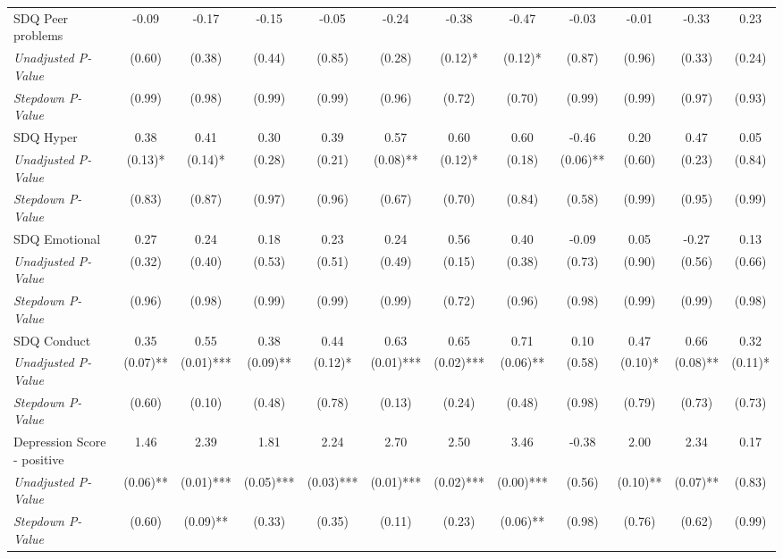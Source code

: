 \begin{tabular}{l c c c c c c c c c c c}
SDQ Peer problems & -0.09 & -0.17 & -0.15 & -0.05 & -0.24 & -0.38 & -0.47 & -0.03 & -0.01 & -0.33 & 0.23 \\
\quad \textit{Unadjusted P-Value} & (0.60) & (0.38) & (0.44) & (0.85) & (0.28) & (0.12)* & (0.12)* & (0.87) & (0.96) & (0.33) & (0.24) \\
\quad \textit{Stepdown P-Value} & (0.99) & (0.98) & (0.99) & (0.99) & (0.96) & (0.72) & (0.70) & (0.99) & (0.99) & (0.97) & (0.93) \\
SDQ Hyper & 0.38 & 0.41 & 0.30 & 0.39 & 0.57 & 0.60 & 0.60 & -0.46 & 0.20 & 0.47 & 0.05 \\
\quad \textit{Unadjusted P-Value} & (0.13)* & (0.14)* & (0.28) & (0.21) & (0.08)** & (0.12)* & (0.18) & (0.06)** & (0.60) & (0.23) & (0.84) \\
\quad \textit{Stepdown P-Value} & (0.83) & (0.87) & (0.97) & (0.96) & (0.67) & (0.70) & (0.84) & (0.58) & (0.99) & (0.95) & (0.99) \\
SDQ Emotional & 0.27 & 0.24 & 0.18 & 0.23 & 0.24 & 0.56 & 0.40 & -0.09 & 0.05 & -0.27 & 0.13 \\
\quad \textit{Unadjusted P-Value} & (0.32) & (0.40) & (0.53) & (0.51) & (0.49) & (0.15) & (0.38) & (0.73) & (0.90) & (0.56) & (0.66) \\
\quad \textit{Stepdown P-Value} & (0.96) & (0.98) & (0.99) & (0.99) & (0.99) & (0.72) & (0.96) & (0.98) & (0.99) & (0.99) & (0.98) \\
SDQ Conduct & 0.35 & 0.55 & 0.38 & 0.44 & 0.63 & 0.65 & 0.71 & 0.10 & 0.47 & 0.66 & 0.32 \\
\quad \textit{Unadjusted P-Value} & (0.07)** & (0.01)*** & (0.09)** & (0.12)* & (0.01)*** & (0.02)*** & (0.06)** & (0.58) & (0.10)* & (0.08)** & (0.11)* \\
\quad \textit{Stepdown P-Value} & (0.60) & (0.10) & (0.48) & (0.78) & (0.13) & (0.24) & (0.48) & (0.98) & (0.79) & (0.73) & (0.73) \\
Depression Score - positive & 1.46 & 2.39 & 1.81 & 2.24 & 2.70 & 2.50 & 3.46 & -0.38 & 2.00 & 2.34 & 0.17 \\
\quad \textit{Unadjusted P-Value} & (0.06)** & (0.01)*** & (0.05)*** & (0.03)*** & (0.01)*** & (0.02)*** & (0.00)*** & (0.56) & (0.10)** & (0.07)** & (0.83) \\
\quad \textit{Stepdown P-Value} & (0.60) & (0.09)** & (0.33) & (0.35) & (0.11) & (0.23) & (0.06)** & (0.98) & (0.76) & (0.62) & (0.99) \\
\bottomrule
\end{tabular}
